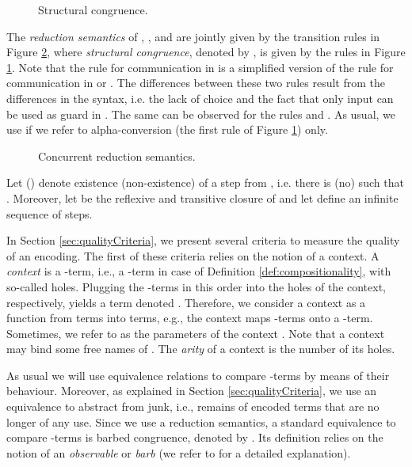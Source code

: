 \documentclass[]{llncs}
\begin{document}
\begin{figure}[htp]
	
	\caption{Structural congruence.} \label{fig:SC}
\end{figure}

The \emph{reduction semantics} of \piMix, \piSep, and \piAsyn are jointly given by the transition rules in Figure \ref{fig:concurrentReductionSemantics}, where \emph{structural congruence}, denoted by , is given by the rules in Figure \ref{fig:SC}. Note that the rule  for communication in \piAsyn is a simplified version of the rule  for communication in \piMix or \piSep. The differences between these two rules result from the differences in the syntax, i.e. the lack of choice and the fact that only input can be used as guard in \piAsyn. The same can be observed for the rules  and . As usual, we use  if we refer to alpha-conversion (the first rule of Figure \ref{fig:SC}) only.

\begin{figure}[htp]
	
	\caption{Concurrent reduction semantics.} \label{fig:concurrentReductionSemantics}
\end{figure}

Let  () denote existence (non-existence) of a step from , i.e. there is (no)  such that . Moreover, let  be the reflexive and transitive closure of  and let  define an infinite sequence of steps.

In Section \ref{sec:qualityCriteria}, we present several criteria to measure the quality of an encoding. The first of these criteria relies on the notion of a context. A \emph{context}  is a \piCal-term, i.e., a \piAsyn-term in case of Definition \ref{def:compositionality}, with~ so-called holes. Plugging the \piAsyn-terms  in this order into the holes  of the context, respectively, yields a term denoted . Therefore, we consider a context as a function from terms into terms, e.g., the context  maps  \piAsyn-terms onto a \piAsyn-term. Sometimes, we refer to  as the parameters of the context . Note that a context may bind some free names of . The \emph{arity} of a context is the number of its holes.

As usual we will use equivalence relations to compare \piCal-terms by means of their behaviour. Moreover, as explained in Section \ref{sec:qualityCriteria}, we use an equivalence to abstract from junk, i.e., remains of encoded terms that are no longer of any use. Since we use a reduction semantics, a standard equivalence to compare \piMix-terms is barbed congruence, denoted by . Its definition relies on the notion of an \emph{observable} or \emph{barb} (we refer to \cite{sangiorgiWalker01} for a detailed explanation).
\end{document}
